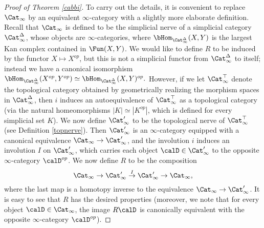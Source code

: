 \begin{proof}[Proof of Theorem \ref{cabbi}]
To carry out the details, it is convenient to replace $\Cat_{\infty}$ by an equivalent
$\infty$-category with a slightly more elaborate definition. Recall that $\Cat_{\infty}$ is defined to be the simplicial nerve of a simplicial category $\Cat_{\infty}^{\Delta}$, whose objects are $\infty$-categories, where $\bHom_{\Cat_{\infty}^{\Delta}}(X,Y)$ is the largest Kan complex contained in
$\Fun(X,Y)$. We would like to define $R$ to be induced by the functor $X \mapsto X^{op}$, but this
is not a simplicial functor from $\Cat_{\infty}^{\Delta}$ to itself; instead we have a canonical isomorphism $\bHom_{\Cat_{\infty}^{\Delta}}( X^{op}, Y^{op} )
\simeq \bHom_{\Cat_{\infty}^{\Delta}}(X,Y)^{op}.$
However, if we let $\Cat_{\infty}^{\top}$ denote the topological category obtained by geometrically realizing the morphism spaces in 
$\Cat_{\infty}^{\Delta}$, then $i$ induces an autoequivalence of $\Cat_{\infty}^{\top}$ as a topological category (via the natural homeomorphisms $| K | \simeq |K^{op}|$, which is defined for every simplicial set $K$). We now define $\Cat'_{\infty}$ to be the topological nerve of $\Cat_{\infty}^{\top}$ (see 
Definition \ref{topnerve}). Then $\Cat'_{\infty}$ is an $\infty$-category equipped with a canonical equivalence $\Cat_{\infty} \rightarrow \Cat'_{\infty}$, and the involution $i$ induces
an involution $I$ on $\Cat'_{\infty}$, which carries each object $\calD \in \Cat'_{\infty}$ to 
the opposite $\infty$-category $\calD^{op}$. We now define $R$ to be the composition
$$ \Cat_{\infty} \rightarrow \Cat'_{\infty} \stackrel{I}{\rightarrow} \Cat'_{\infty} \rightarrow \Cat_{\infty},$$
where the last map is a homotopy inverse to the equivalence $\Cat_{\infty} \rightarrow \Cat'_{\infty}$.
It is easy to see that $R$ has the desired properties (moreover, we note that for every
object $\calD \in \Cat_{\infty}$, the image $R \calD$ is canonically equivalent with the opposite $\infty$-category $\calD^{op}$).
\end{proof}
